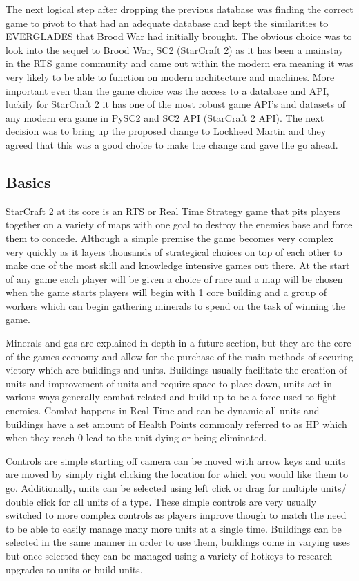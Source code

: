 \documentclass[a4paper,12pt]{report}
\begin{document}
The next logical step after dropping the previous database was finding the correct game to pivot to that had an adequate database and kept the similarities to EVERGLADES that Brood War had initially brought. The obvious choice was to look into the sequel to Brood War, SC2 (StarCraft 2) as it has been a mainstay in the RTS game community and came out within the modern era meaning it was very likely to be able to function on modern architecture and machines. More important even than the game choice was the access to a database and API, luckily for StarCraft 2 it has one of the most robust game API’s and datasets of any modern era game in PySC2 and SC2 API (StarCraft 2 API). The next decision was to bring up the proposed change to Lockheed Martin and they agreed that this was a good choice to make the change and gave the go ahead.

\subsection{Basics}

StarCraft 2 at its core is an RTS or Real Time Strategy game that pits players together on a variety of maps with one goal to destroy the enemies base and force them to concede. Although a simple premise the game becomes very complex very quickly as it layers thousands of strategical choices on top of each other to make one of the most skill and knowledge intensive games out there. At the start of any game each player will be given a choice of race and a map will be chosen when the game starts players will begin with 1 core building and a group of workers which can begin gathering minerals to spend on the task of winning the game.

Minerals and gas are explained in depth in a future section, but they are the core of the games economy and allow for the purchase of the main methods of securing victory which are buildings and units. Buildings usually facilitate the creation of units and improvement of units and require space to place down, units act in various ways generally combat related and build up to be a force used to fight enemies. Combat happens in Real Time and can be dynamic all units and buildings have a set amount of Health Points commonly referred to as HP which when they reach 0 lead to the unit dying or being eliminated.

Controls are simple starting off camera can be moved with arrow keys and units are moved by simply right clicking the location for which you would like them to go. Additionally, units can be selected using left click or drag for multiple units/ double click for all units of a type. These simple controls are very usually switched to more complex controls as players improve though to match the need to be able to easily manage many more units at a single time. Buildings can be selected in the same manner in order to use them, buildings come in varying uses but once selected they can be managed using a variety of hotkeys to research upgrades to units or build units.
\end{document}
